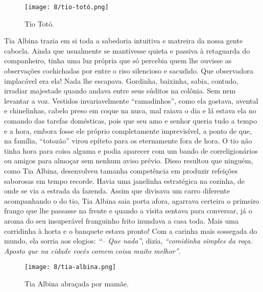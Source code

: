 \begin{figure}[H]
\centering
\texttt{[image: 8/tio-totó.png]}
\caption{Tio Totó.}
\end{figure}

Tia Albina trazia em si toda a sabedoria intuitiva e matreira da nossa gente cabocla. 
Ainda que usualmente se mantivesse quieta e passiva à retaguarda do companheiro, tinha uma luz própria que só percebia quem lhe ouvisse as observações cochichadas por entre o riso silencioso e sacudido. 
Que observadora implacável era ela! Nada lhe escapava.  
Gordinha, baixinha, sabia, contudo, irradiar majestade quando andava entre seus súditos na colônia. 
Sem nem levantar a voz.  
Vestidos invariavelmente ``ramadinhos'', como ela gostava, avental e chinelinhas, cabelo preso em coque na nuca, mal raiava o dia e lá estava ela no comando das tarefas domésticas, pois que seu amo e senhor queria tudo a tempo e a hora, embora fosse ele próprio completamente imprevisível, a ponto de que, na família, ``totozão'' virou epíteto para os eternamente fora de hora.  
O tio não tinha hora para coisa alguma e podia aparecer com um bando de correligionários ou amigos para almoçar sem nenhum aviso prévio. 
Disso resultou que ninguém, como Tia Albina, desenvolveu tamanha competência em produzir refeições saborosas em tempo recorde. Havia uma janelinha estratégica na cozinha, de onde se via a estrada da fazenda. 
Assim que divisava um carro diferente acompanhando o do tio, Tia Albina saia porta afora, agarrava certeira o primeiro frango que lhe passasse na frente e quando a visita sentava para conversar, já o aroma do seu insuperável franguinho frito inundava a casa toda. 
Mais uma corridinha à horta e o banquete estava pronto! Com a carinha mais sossegada do mundo, ela sorria aos elogios:
\textit{``-- Que nada''}, dizia, \textit{``comidinha simples da roça. Aposto que na cidade vocês comem coisa muito melhor''}.

\begin{figure}[H]
\centering
\texttt{[image: 8/tia-albina.png]}
\caption{Tia Albina abraçada por mamãe.}
\end{figure}


